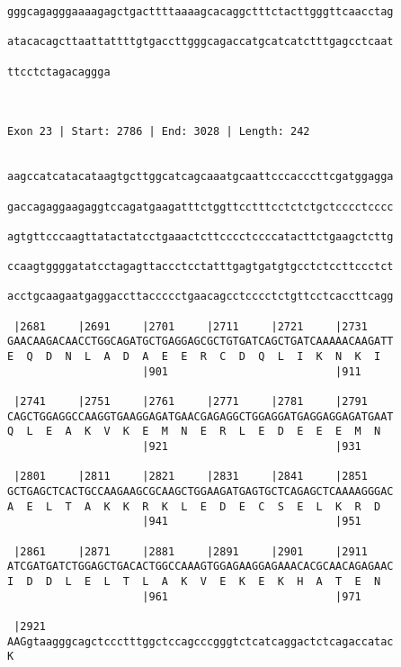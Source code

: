 \documentclass{article}
\begin{document}
\begin{Verbatim}
gggcagagggaaaagagctgacttttaaaagcacaggctttctacttgggttcaacctag
                                                            
atacacagcttaattattttgtgaccttgggcagaccatgcatcatctttgagcctcaat
                                                            
ttcctctagacaggga
                
                
 
Exon 23 | Start: 2786 | End: 3028 | Length: 242


aagccatcatacataagtgcttggcatcagcaaatgcaattcccacccttcgatggagga
                                                            
gaccagaggaagaggtccagatgaagatttctggttcctttcctctctgctcccctcccc
                                                            
agtgttcccaagttatactatcctgaaactcttcccctccccatacttctgaagctcttg
                                                            
ccaagtggggatatcctagagttaccctcctatttgagtgatgtgcctctccttccctct
                                                            
acctgcaagaatgaggaccttaccccctgaacagcctcccctctgttcctcaccttcagg
                                                            
 |2681     |2691     |2701     |2711     |2721     |2731    
GAACAAGACAACCTGGCAGATGCTGAGGAGCGCTGTGATCAGCTGATCAAAAACAAGATT
E  Q  D  N  L  A  D  A  E  E  R  C  D  Q  L  I  K  N  K  I  
                     |901                          |911     
  
 |2741     |2751     |2761     |2771     |2781     |2791    
CAGCTGGAGGCCAAGGTGAAGGAGATGAACGAGAGGCTGGAGGATGAGGAGGAGATGAAT
Q  L  E  A  K  V  K  E  M  N  E  R  L  E  D  E  E  E  M  N  
                     |921                          |931     
  
 |2801     |2811     |2821     |2831     |2841     |2851    
GCTGAGCTCACTGCCAAGAAGCGCAAGCTGGAAGATGAGTGCTCAGAGCTCAAAAGGGAC
A  E  L  T  A  K  K  R  K  L  E  D  E  C  S  E  L  K  R  D  
                     |941                          |951     
  
 |2861     |2871     |2881     |2891     |2901     |2911    
ATCGATGATCTGGAGCTGACACTGGCCAAAGTGGAGAAGGAGAAACACGCAACAGAGAAC
I  D  D  L  E  L  T  L  A  K  V  E  K  E  K  H  A  T  E  N  
                     |961                          |971     
  
 |2921                                                      
AAGgtaagggcagctccctttggctccagcccgggtctcatcaggactctcagaccatac
K                                                           
                                                            

\end{Verbatim}
\end{document}
